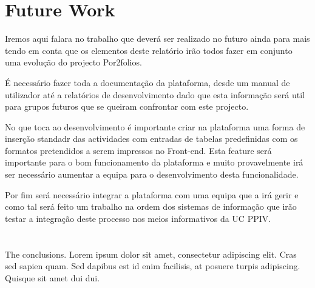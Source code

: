 \documentclass[a4paper,12pt,journal,twoside,compsoc]{PPIEEEtran}
\begin{document}

\section{Future Work}

Iremos aqui falara no trabalho que deverá ser realizado no futuro ainda para mais tendo em conta que os elementos deste relatório irão todos fazer em conjunto uma evolução do projecto Por2folios.

É necessário fazer toda a documentação da plataforma, desde um manual de utilizador até a relatórios de desenvolvimento dado que esta informação será util para grupos futuros que se queiram confrontar com este projecto.

No que toca ao desenvolvimento é importante criar na plataforma uma forma de inserção standadr das actividades com entradas de tabelas predefinidas com os formatos pretendidos a serem impressos no Front-end. Esta feature será importante para o bom funcionamento da plataforma e muito provavelmente irá ser necessário aumentar a equipa para o desenvolvimento desta funcionalidade.

Por fim será necessário integrar a plataforma com uma equipa que a irá gerir e como tal será feito um trabalho na ordem dos sistemas de informação que irão testar a integração deste processo nos meios informativos da UC PPIV.

\section{}
The conclusions. Lorem ipsum dolor sit amet, consectetur adipiscing elit. Cras sed sapien quam. Sed dapibus est id enim facilisis, at posuere turpis adipiscing. Quisque sit amet dui dui.
\end{document}

